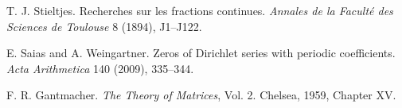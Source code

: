  T. J. Stieltjes. Recherches sur les fractions continues. \emph{Annales de la Facult\'e des Sciences de Toulouse} 8 (1894), J1--J122.

 E. Saias and A. Weingartner. Zeros of Dirichlet series with periodic coefficients. \emph{Acta Arithmetica} 140 (2009), 335--344.

 F. R. Gantmacher. \emph{The Theory of Matrices}, Vol. 2. Chelsea, 1959, Chapter XV.
